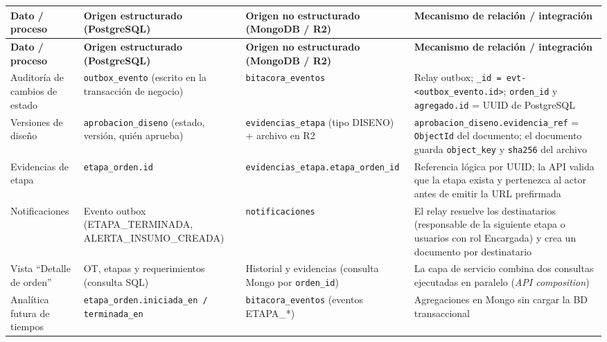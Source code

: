\documentclass[11pt,a4paper]{article}
\begin{document}
\begingroup\small
\begin{longtable}{@{}>{\raggedright\arraybackslash\hspace{0pt}}p{}>{\raggedright\arraybackslash\hspace{0pt}}p{}>{\raggedright\arraybackslash\hspace{0pt}}p{}>{\raggedright\arraybackslash\hspace{0pt}}p{}@{}}
\toprule
\textbf{Dato / proceso} & \textbf{Origen estructurado (PostgreSQL)} & \textbf{Origen no estructurado (MongoDB / R2)} & \textbf{Mecanismo de relación / integración} \\ \midrule
\endfirsthead
\toprule
\textbf{Dato / proceso} & \textbf{Origen estructurado (PostgreSQL)} & \textbf{Origen no estructurado (MongoDB / R2)} & \textbf{Mecanismo de relación / integración} \\ \midrule
\endhead
\bottomrule
\endlastfoot
Auditoría de cambios de estado & \texttt{outbox\_\allowbreak{}evento} (escrito en la transacción de negocio) & \texttt{bitacora\_\allowbreak{}eventos} & Relay outbox; \texttt{\_\allowbreak{}id = evt-{}\allowbreak{}<outbox\_\allowbreak{}evento.\allowbreak{}id>}; \texttt{orden\_\allowbreak{}id} y \texttt{agregado.\allowbreak{}id} = UUID de PostgreSQL \\ \addlinespace[0.25em]
Versiones de diseño & \texttt{aprobacion\_\allowbreak{}diseno} (estado, versión, quién aprueba) & \texttt{evidencias\_\allowbreak{}etapa} (tipo DISENO) + archivo en R2 & \texttt{aprobacion\_\allowbreak{}diseno.\allowbreak{}evidencia\_\allowbreak{}ref} = \texttt{Object\allowbreak{}Id} del documento; el documento guarda \texttt{object\_\allowbreak{}key} y \texttt{sha256} del archivo \\ \addlinespace[0.25em]
Evidencias de etapa & \texttt{etapa\_\allowbreak{}orden.\allowbreak{}id} & \texttt{evidencias\_\allowbreak{}etapa.\allowbreak{}etapa\_\allowbreak{}orden\_\allowbreak{}id} & Referencia lógica por UUID; la API valida que la etapa exista y pertenezca al actor antes de emitir la URL prefirmada \\ \addlinespace[0.25em]
Notificaciones & Evento outbox (ETAPA\_TERMINADA, ALERTA\_INSUMO\_CREADA) & \texttt{notificaciones} & El relay resuelve los destinatarios (responsable de la siguiente etapa o usuarios con rol Encargada) y crea un documento por destinatario \\ \addlinespace[0.25em]
Vista ``Detalle de orden'' & OT, etapas y requerimientos (consulta SQL) & Historial y evidencias (consulta Mongo por \texttt{orden\_\allowbreak{}id}) & La capa de servicio combina dos consultas ejecutadas en paralelo (\textit{API composition}) \\ \addlinespace[0.25em]
Analítica futura de tiempos & \texttt{etapa\_\allowbreak{}orden.\allowbreak{}iniciada\_\allowbreak{}en / terminada\_\allowbreak{}en} & \texttt{bitacora\_\allowbreak{}eventos} (eventos ETAPA\_*) & Agregaciones en Mongo sin cargar la BD transaccional \\
\end{longtable}
\endgroup
\end{document}
